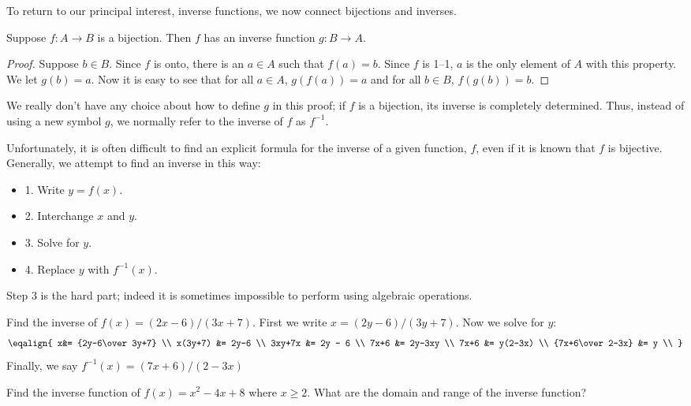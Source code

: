 \begin{theorem}
\begin{theorem}
To return to our principal interest, inverse functions, we now connect
bijections and inverses.

\begin{theorem} Suppose $f\colon A\to B$ is a bijection. Then $f$ has an inverse
function $g\colon B\to A$. 
\begin{proof}
Suppose $b\in B$. Since $f$ is onto, there is an $a\in A$ such that 
$f(a)=b$. Since $f$ is 1--1, $a$ is the only element of $A$ with this
property. We let $g(b)=a$. Now it is easy to see that
for all $a\in A$, $g(f(a))=a$ and for all $b\in B$, $f(g(b))=b$. 
\end{proof}

We really don't have any choice about how to define $g$ in this proof;
if $f$ is a bijection, its inverse is completely determined. Thus,
instead of using a new symbol $g$, we normally refer to the inverse of
$f$ as $f^{-1}$.

Unfortunately, it is often difficult to find an explicit formula
for the inverse of a given function, $f$, even if it is known that $f$
is bijective. Generally, we attempt to find an inverse in this way:

\begin{itemize} %
\item{1.} Write $y=f(x)$.
\item{2.} Interchange $x$ and $y$.
\item{3.} Solve for $y$.
\item{4.} Replace $y$ with $f^{-1}(x)$.
\end{itemize}

Step 3 is the hard part; indeed it is
sometimes   impossible to perform using algebraic operations.

\begin{example} Find the inverse of $f(x) =(2x-6)/(3x+7)$.
First we write $x=(2y-6)/(3y+7)$.
Now we solve for $y$:
$$\eqalign{
x&= {2y-6\over3y+7} \\
x(3y+7) &= 2y-6 \\
3xy+7x &= 2y - 6 \\
7x+6 &= 2y-3xy \\
7x+6 &= y(2-3x) \\
{7x+6\over 2-3x} &= y \\
}$$
Finally, we say $f^{-1} (x) =(7x+6)/(2-3x)$
\end{example}


\begin{example} Find the inverse function of $f(x) =x^2 - 4x + 8 $
where $x \geq 2 $. What are the domain and range of the inverse
function?


\end{example}
\end{theorem}
\end{theorem}
\end{theorem}
